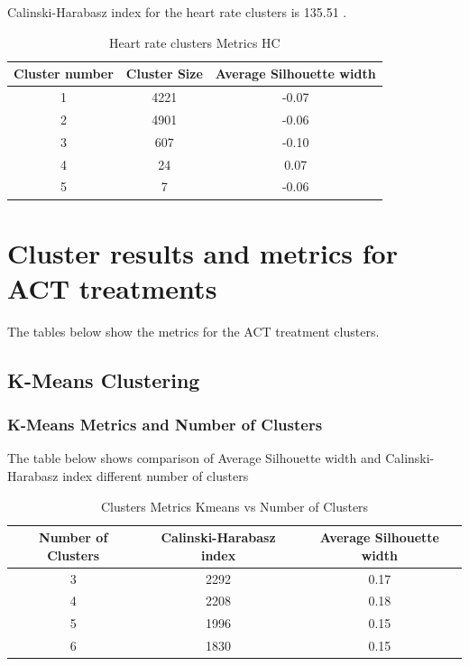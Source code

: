 \documentclass{article}
\begin{document}
Calinski-Harabasz index for the heart rate clusters is 135.51 .

\begin{table}[H]
  \caption{Heart rate clusters Metrics HC}
  \label{hr_metrics}
  \centering
  \begin{tabular}{ c|c|c}
    \toprule
    \cmidrule(r){1-2}
    Cluster number & Cluster Size & Average Silhouette width \\
    \midrule
    1 & 4221 & -0.07 \\
    2 & 4901 & -0.06 \\
    3 & 607 & -0.10 \\
    4 & 24 & 0.07 \\
    5 & 7 & -0.06 \\
    \bottomrule
    \end{tabular}
\end{table}

\newpage
\section{Cluster results and metrics for ACT treatments}
\label{appendix:actclusters}

The tables below show the metrics for the ACT treatment clusters.
\subsection{K-Means Clustering}
\label{appendix:actKmeans}
\subsubsection{K-Means Metrics and Number of Clusters}
\label{appendix:actKmeansmetrics}
The table below shows comparison of Average Silhouette width and Calinski-Harabasz index different number of clusters

\begin{table}[H]
  \caption{Clusters Metrics Kmeans vs Number of Clusters}
  \label{steps_metrics}
  \centering
  \begin{tabular}{ c|c|c}
    \toprule
    \cmidrule(r){1-2}
    Number of Clusters & Calinski-Harabasz index & Average Silhouette width \\
    \midrule
    3 & 2292 & 0.17 \\
    4 & 2208 & 0.18 \\
    5 & 1996 & 0.15 \\
    6 & 1830 & 0.15 \\
    \bottomrule
    \end{tabular}
\end{table}
\end{document}
